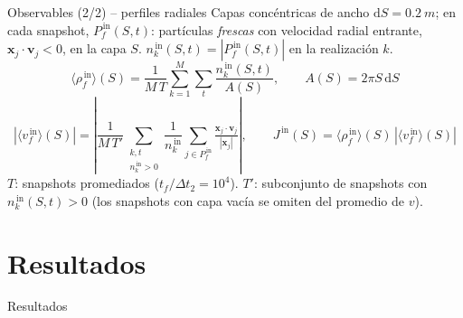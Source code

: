 \documentclass[10pt,aspectratio=169]{beamer}
\newcommand{\vect}[1]{\mathbf{#1}}
\begin{document}
\begin{frame}{Observables (2/2) -- perfiles radiales}
    Capas concéntricas de ancho $\mathrm{d}S = \SI{0.2}{m}$; en cada snapshot,
    $P_f^{\,\text{in}}(S, t)$: partículas \emph{frescas} con velocidad radial
    entrante, $\vect{x}_j\!\cdot\!\vect{v}_j < 0$, en la capa $S$.
    $n_k^{\,\text{in}}(S, t) = |P_f^{\,\text{in}}(S,t)|$ en la realización $k$.
    \[
        \langle\rho_f^{\,\text{in}}\rangle(S)
          = \frac{1}{M\,T}\sum_{k=1}^{M}\sum_{t}\frac{n_k^{\,\text{in}}(S,t)}{A(S)},
        \qquad
        A(S) = 2\pi S\,\mathrm{d}S
    \]
    \[
        |\langle v_f^{\,\text{in}}\rangle(S)|
          = \left|\frac{1}{M\,T'}\!\!
                  \sum_{\substack{k,t\\ n_k^{\,\text{in}}>0}}
                  \frac{1}{n_k^{\,\text{in}}}
                  \!\!\sum_{j\in P_f^{\,\text{in}}}\!\!\tfrac{\vect{x}_j\!\cdot\!\vect{v}_j}{|\vect{x}_j|}\right|,
        \qquad
        J^{\,\text{in}}(S) = \langle\rho_f^{\,\text{in}}\rangle(S)\,
                             |\langle v_f^{\,\text{in}}\rangle(S)|
    \]
    {\footnotesize $T$: snapshots promediados ($t_f/\Delta t_2 = 10^4$). \quad
                   $T'$: subconjunto de snapshots con $n_k^{\,\text{in}}(S,t) > 0$
                   (los snapshots con capa vacía se omiten del promedio de $v$).}
\end{frame}

\section{Resultados}

\begin{frame}[plain,c]
    \centering
    {\fontsize{48}{56}\selectfont Resultados\par}
\end{frame}
\end{document}
